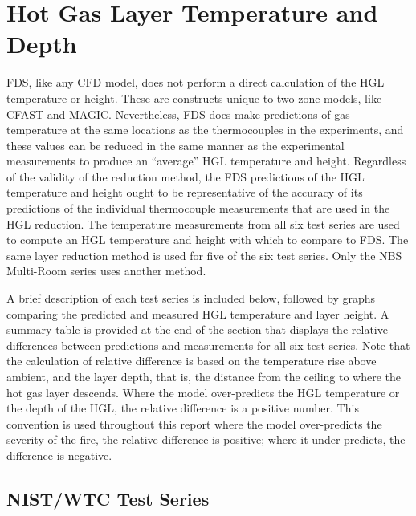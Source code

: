 \chapter{Hot Gas Layer Temperature and Depth}

FDS, like any CFD model, does not perform a direct calculation of the HGL temperature or height. These are constructs unique to two-zone models, like
CFAST and MAGIC. Nevertheless, FDS does make predictions of gas temperature at the same locations as the thermocouples in the experiments, and these
values can be reduced in the same manner as the experimental measurements to produce an ``average'' HGL temperature and height.  Regardless of the
validity of the reduction method, the FDS predictions of the HGL temperature and height ought to be representative of the accuracy of its predictions
of the individual thermocouple measurements that are used in the HGL reduction. The temperature measurements from all six test series are used to
compute an HGL temperature and height with which to compare to FDS.  The same layer reduction method is used for five of the six test series. Only
the NBS Multi-Room series uses another method.

A brief description of each test series is included below, followed by graphs comparing the predicted and measured HGL temperature and layer height.
A summary table is provided at the end of the section that displays the relative differences between predictions and measurements for all six test
series.  Note that the calculation of relative difference is based on the temperature rise above ambient, and the layer depth, that is, the distance
from the ceiling to where the hot gas layer descends.  Where the model over-predicts the HGL temperature or the depth of the HGL, the relative
difference is a positive number. This convention is used throughout this report where the model over-predicts the severity of the fire, the relative
difference is positive; where it under-predicts, the difference is negative.

\clearpage


\section{NIST/WTC Test Series}



